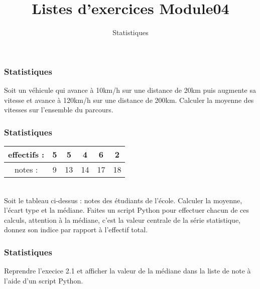 \documentclass{beamer}
\begin{document}
  
  \title{Listes d'exercices Module04  }
  \subtitle{Statistiques}
  \maketitle

  \begin{frame} %
  \frametitle{Statistiques}
  \begin{exercice}[1]
   Soit un véhicule qui avance à 10km/h sur une distance de 20km puis augmente sa vitesse et avance à 120km/h sur une distance de 200km. Calculer la moyenne des vitesses sur l'ensemble du parcours.
  \end{exercice}

\end{frame}

\begin{frame} %
  \frametitle{Statistiques}
  \begin{exercice}[2.1]
    \begin{tabular}{|c|c|c|c|c|c|}
      \hline
      effectifs : & 5 & 5 & 4 & 6 & 2 \\
      \hline
      notes : & 9 & 13 & 14 & 17 & 18\\
      \hline
   \end{tabular}
   \\
   Soit le tableau ci-dessus : notes des étudiants de l'école. Calculer la moyenne, l'écart type et la médiane. Faites un script Python pour effectuer chacun de ces calculs, attention à la médiane, c'est la valeur centrale de la série statistique, donnez son indice par rapport à l'effectif total. 
  \end{exercice}

\end{frame}

\begin{frame} %
  \frametitle{Statistiques}
  \begin{exercice}[2.2 Challenge]
  Reprendre l'execice 2.1 et afficher la valeur de la médiane dans la liste de note à l'aide d'un script Python.
  \end{exercice}
\end{frame}
\end{document}
